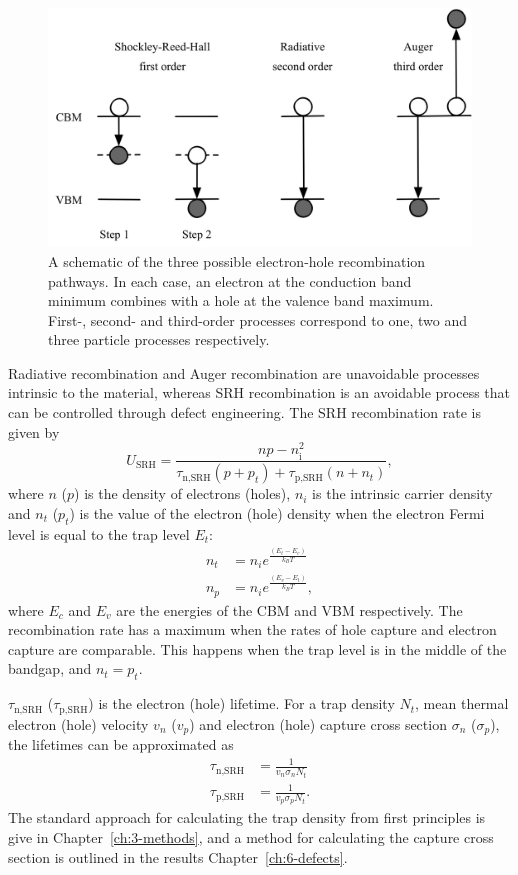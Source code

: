 \begin{figure}[h]
 \centering
   \includegraphics[width=0.65\columnwidth]{figures/ch1/recombination.png}
   \caption[Electron-hole recombination pathways]{A schematic of the three possible electron-hole recombination pathways. In each case, an electron at the conduction band minimum combines with a hole at the valence band maximum. First-, second- and third-order processes correspond to one, two and three particle processes respectively.}
   \label{recombination_processes}
 \end{figure}

Radiative recombination and Auger recombination are unavoidable processes intrinsic to the material, whereas SRH recombination is an avoidable process that can be controlled through defect engineering. The SRH recombination rate is given by
\begin{equation}
U_\textrm{SRH} = \frac{np-n_\textrm{i}^2}{\tau_\textrm{n,SRH}(p+p_t)+\tau_\textrm{p,SRH}(n+n_t)},
\end{equation}
where $n$ ($p$) is the density of electrons (holes), $n_i$ is the intrinsic carrier density and $n_t$ ($p_t$) is the value of the electron (hole) density when the electron Fermi level is equal to the trap level $E_t$: 
\begin{align}
n_t &= n_ie^{\frac{(E_t-E_c)}{k_BT}} \\
n_p &= n_ie^{\frac{(E_v-E_t)}{k_BT}},
\end{align}
where $E_c$ and $E_v$ are the energies of the CBM and VBM respectively. The recombination rate has a maximum when the rates of hole capture and electron capture are comparable. This happens when the trap level is in the middle of the bandgap, and $n_t = p_t$. %

$\tau_\textrm{n,SRH}$ ($\tau_\textrm{p,SRH}$) is the electron (hole) lifetime. For a trap density $N_t$, mean thermal electron (hole) velocity $v_n$ ($v_p$) and electron (hole) capture cross section $\sigma_n$ ($\sigma_p$), the lifetimes can be approximated as 
\begin{align}
\tau_\textrm{n,SRH} &= \frac{1}{v_n\sigma_nN_t} \\
\tau_\textrm{p,SRH} &= \frac{1}{v_p\sigma_pN_t}.
\end{align}
The standard approach for calculating the trap density from first principles is give in Chapter\ \ref{ch:3-methods}, and a method for calculating the capture cross section is outlined in the results Chapter\ \ref{ch:6-defects}.

